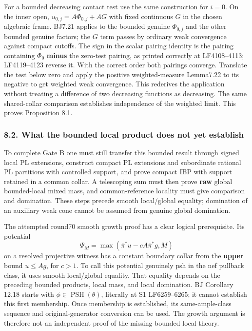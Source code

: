 \documentclass[
  10pt,
]{article}
\begin{document}
For a bounded decreasing contact test use the same construction for
\(i=0\). On the inner open, \(u_{0,j}=A\Phi_{0,j}+AG\) with fixed
continuous \(G\) in the chosen algebraic frame. BJ7.21 applies to the
bounded genuine \(\Phi_{0,j}\) and the other bounded genuine factors;
the \(G\) term passes by ordinary weak convergence against compact
cutoffs. The sign in the scalar pairing identity is the pairing
containing \(\Phi_0\) \textbf{minus} the zero-test pairing, as printed
correctly at LF4108--4113; LF4119--4123 reverse it. With the correct
order both pairings converge. Translate the test below zero and apply
the positive weighted-measure Lemma7.22 to its negative to get weighted
weak convergence. This rederives the application without treating a
difference of two decreasing functions as decreasing. The same
shared-collar comparison establishes independence of the weighted limit.
This proves Proposition 8.1.

\subsubsection{8.2. What the bounded local product does not yet
establish}\label{what-the-bounded-local-product-does-not-yet-establish}

To complete Gate B one must still transfer this bounded result through
signed local PL extensions, construct compact PL extensions and
subordinate rational PL partitions with controlled support, and prove
compact IBP with support retained in a common collar. A telescoping sum
must then prove \textbf{raw} global bounded-local mixed mass, and
common-reference locality must give comparison and domination. These
steps precede smooth local/global equality; domination of an auxiliary
weak cone cannot be assumed from genuine global domination.

The attempted round70 smooth growth proof has a clear logical
prerequisite. Its potential \[\Psi_M=\max(\bar\pi^*u-cA\bar\pi^*g,M)\]
on a resolved projective witness has a constant boundary collar from the
\textbf{upper} bound \(u\le Ag\), for \(c>1\). To call this potential
genuinely psh in the nef pullback class, it uses smooth local/global
equality. That equality depends on the preceding bounded products, local
mass, and local domination. BJ Corollary 12.18 starts with
\(\phi\in\operatorname{PSH}(\theta)\), literally at S1 LF6259--6265; it
cannot establish this first membership. Once membership is established,
its same-ample-class sequence and original-generator conversion can be
used. The growth argument is therefore not an independent proof of the
missing bounded local theory.
\end{document}
